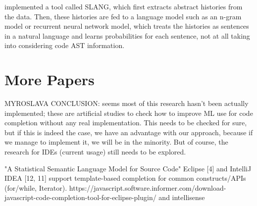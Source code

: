 \cite{Rayc14a} implemented a tool called SLANG, which ﬁrst extracts abstract histories from the data. Then, these histories are fed to a language model such as an n-gram model or recurrent neural network model, which treats the histories as sentences in a natural language and learns probabilities for each sentence, not at all taking into considering code AST information.

\section{More Papers}
MYROSLAVA CONCLUSION: seems most of this research hasn't been actually implemented; these are artificial studies to check how to improve ML use for code completion without any real implementation. This needs to be checked for sure, but if this is indeed the case, we have an advantage with our approach, because if we manage to implement it, we will be in the minority. But of course, the research for IDEs (current usage) still needs to be explored.

"A Statistical Semantic Language Model for Source Code"
Eclipse [4] and IntelliJ IDEA [12, 11] support template-based completion for common constructs/APIs (for/while, Iterator).
https://javascript.software.informer.com/download-javascript-code-completion-tool-for-eclipse-plugin/
and intellisense